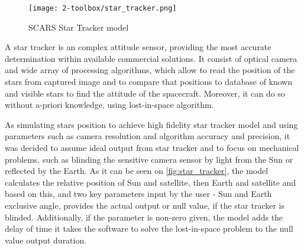         \begin{figure}[H]
            \centering
            \texttt{[image: 2-toolbox/star\_tracker.png]}
            \caption{SCARS Star Tracker model}
            \label{fig:star_tracker}
        \end{figure}

        A star tracker is an complex attitude sensor, providing the most accurate determination within available commercial solutions. It consist of optical camera and wide array of processing algorithms, which allow to read the position of the stars from captured image and to compare that positions to database of known and visible stars to find the attitude of the spacecraft. Moreover, it can do so without a-priori knowledge, using lost-in-space algorithm\cite{delabie2016star}.

        As simulating stars position to achieve high fidelity star tracker model and using parameters such as camera resolution and algorithm accuracy and precision, it was decided to assume ideal output from star tracker and to focus on mechanical problems, such as blinding the sensitive camera sensor by light from the Sun or reflected by the Earth. As it can be seen on \autoref{fig:star_tracker}, the model calculates the relative position of Sun and satellite, then Earth and satellite and based on this, and two key parameters input by the user - Sun and Earth exclusive angle, provides the actual output or null value, if the star tracker is blinded. Additionally, if the parameter is non-zero given, the model adds the delay of time it takes the software to solve the lost-in-space problem to the null value output duration.